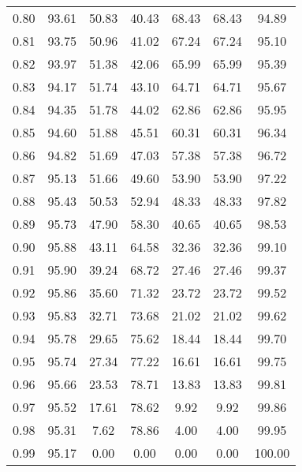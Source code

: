 \begin{tabular}{|c|c|c|c|c|c|c|}
      0.80 &     93.61 &     50.83 &      40.43 &   68.43 &      68.43 &         94.89 \\
      0.81 &     93.75 &     50.96 &      41.02 &   67.24 &      67.24 &         95.10 \\
      0.82 &     93.97 &     51.38 &      42.06 &   65.99 &      65.99 &         95.39 \\
      0.83 &     94.17 &     51.74 &      43.10 &   64.71 &      64.71 &         95.67 \\
      0.84 &     94.35 &     51.78 &      44.02 &   62.86 &      62.86 &         95.95 \\
      0.85 &     94.60 &     51.88 &      45.51 &   60.31 &      60.31 &         96.34 \\
      0.86 &     94.82 &     51.69 &      47.03 &   57.38 &      57.38 &         96.72 \\
      0.87 &     95.13 &     51.66 &      49.60 &   53.90 &      53.90 &         97.22 \\
      0.88 &     95.43 &     50.53 &      52.94 &   48.33 &      48.33 &         97.82 \\
      0.89 &     95.73 &     47.90 &      58.30 &   40.65 &      40.65 &         98.53 \\
      0.90 &     95.88 &     43.11 &      64.58 &   32.36 &      32.36 &         99.10 \\
      0.91 &     95.90 &     39.24 &      68.72 &   27.46 &      27.46 &         99.37 \\
      0.92 &     95.86 &     35.60 &      71.32 &   23.72 &      23.72 &         99.52 \\
      0.93 &     95.83 &     32.71 &      73.68 &   21.02 &      21.02 &         99.62 \\
      0.94 &     95.78 &     29.65 &      75.62 &   18.44 &      18.44 &         99.70 \\
      0.95 &     95.74 &     27.34 &      77.22 &   16.61 &      16.61 &         99.75 \\
      0.96 &     95.66 &     23.53 &      78.71 &   13.83 &      13.83 &         99.81 \\
      0.97 &     95.52 &     17.61 &      78.62 &    9.92 &       9.92 &         99.86 \\
      0.98 &     95.31 &      7.62 &      78.86 &    4.00 &       4.00 &         99.95 \\
      0.99 &     95.17 &      0.00 &       0.00 &    0.00 &       0.00 &        100.00 \\
\bottomrule
\end{tabular}
